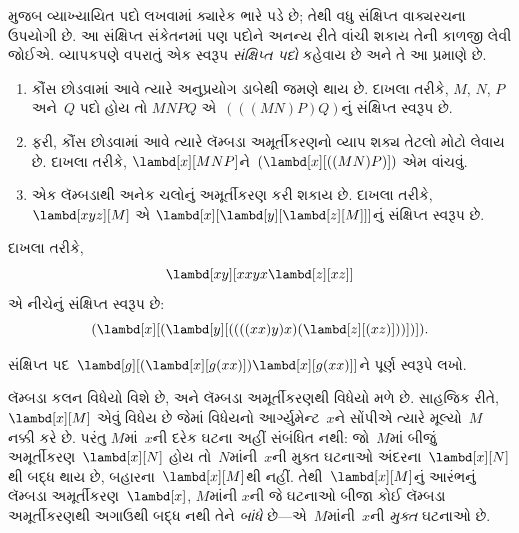 \begingroup
\makeatletter{}\makeatother

\label{guunit:OLP-0359}


 મુજબ વ્યાખ્યાયિત પદો લખવામાં ક્યારેક
ભારે પડે છે; તેથી વધુ સંક્ષિપ્ત વાક્યરચના ઉપયોગી છે. આ
સંક્ષિપ્ત સંકેતનમાં પણ પદોને અનન્ય રીતે વાંચી શકાય તેની
કાળજી લેવી જોઈએ. વ્યાપકપણે વપરાતું એક સ્વરૂપ
\emph{સંક્ષિપ્ત પદો} કહેવાય છે અને તે આ પ્રમાણે છે.

\begin{enumerate}
\item કૌંસ છોડવામાં આવે ત્યારે અનુપ્રયોગ ડાબેથી જમણે થાય છે.
  દાખલા તરીકે, $M$, $N$, $P$ અને~$Q$ પદો હોય તો
  $MNPQ$ એ~$(((MN)P)Q)$નું સંક્ષિપ્ત સ્વરૂપ છે.
\item ફરી, કૌંસ છોડવામાં આવે ત્યારે લૅમ્બડા અમૂર્તીકરણનો
  વ્યાપ શક્ય તેટલો મોટો લેવાય છે. દાખલા તરીકે,
  $\lambd[x][MNP]$ને~$(\lambd[x][((MN)P)])$ એમ વાંચવું.
\item એક લૅમ્બડાથી અનેક ચલોનું અમૂર્તીકરણ કરી શકાય છે.
  દાખલા તરીકે, $\lambd[xyz][M]$ એ
  $\lambd[x][\lambd[y][\lambd[z][M]]]$નું સંક્ષિપ્ત સ્વરૂપ છે.
\end{enumerate}

દાખલા તરીકે,
\[
\lambd[xy][xxyx \lambd[z][xz]]
\]
એ નીચેનું સંક્ષિપ્ત સ્વરૂપ છે:
\[
(\lambd[x][(\lambd[y][((((xx)y)x)(\lambd[z][(xz)]))])]).
\]

\begin{prob}
સંક્ષિપ્ત પદ~$\lambd[g][(\lambd[x][g (x x)])
  \lambd[x][g (x x)]]$ને પૂર્ણ સ્વરૂપે લખો.
\end{prob}
\endgroup


\begingroup
\makeatletter{}\makeatother

\label{guunit:OLP-0360}


લૅમ્બડા કલન વિધેયો વિશે છે, અને લૅમ્બડા અમૂર્તીકરણથી વિધેયો
મળે છે. સાહજિક રીતે, $\lambd[x][M]$ એવું વિધેય છે જેમાં વિધેયનો
આર્ગ્યુમેન્ટ~$x$ને સોંપીએ ત્યારે મૂલ્યો~$M$ નક્કી કરે છે. પરંતુ
$M$માં~$x$ની દરેક ઘટના અહીં સંબંધિત નથી: જો~$M$માં બીજું
અમૂર્તીકરણ~$\lambd[x][N]$ હોય તો~$N$માંની~$x$ની મુક્ત ઘટનાઓ
અંદરના~$\lambd[x][N]$થી બદ્ધ થાય છે, બહારના~$\lambd[x][M]$થી નહીં.
તેથી~$\lambd[x][M]$નું આરંભનું લૅમ્બડા અમૂર્તીકરણ~$\lambd[x]$, $M$માંની
$x$ની જે ઘટનાઓ બીજા કોઈ લૅમ્બડા અમૂર્તીકરણથી અગાઉથી બદ્ધ નથી
તેને \emph{બાંધે} છે---એ~$M$માંની~$x$ની \emph{મુક્ત} ઘટનાઓ છે.


